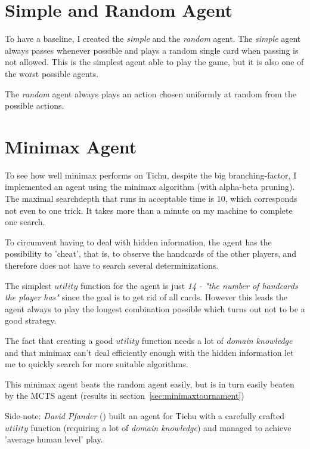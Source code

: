 \section{Simple and Random Agent}
\label{sec:randomagent}
To have a baseline, I created the \textit{simple} and the \textit{random} agent.
The \textit{simple} agent always passes whenever possible and plays a random single card when passing is not allowed. This is the simplest agent able to play the game, but it is also one of the worst possible agents.

The \textit{random} agent always plays an action chosen uniformly at random from the possible actions.


\section{Minimax Agent}
\label{sec:minimaxagent}
To see how well minimax performs on Tichu, despite the big branching-factor, I implemented an agent using the minimax algorithm (with alpha-beta pruning).
The maximal searchdepth that runs in acceptable time is 10, which corresponds not even to one trick. It takes more than a minute on my machine to complete one search.

To circumvent having to deal with hidden information, the agent has the possibility to 'cheat', that is, to observe the handcards of the other players, and therefore does not have to search several determinizations.

The simplest $utility$ function for the agent is just \textit{14 - "the number of handcards the player has"} since the goal is to get rid of all cards. However this leads the agent always to play the longest combination possible which turns out not to be a good strategy.

The fact that creating a good $utility$ function needs a lot of \textit{domain knowledge} and that minimax can't deal efficiently enough with the hidden information let me to quickly search for more suitable algorithms.

This minimax agent beats the random agent easily, but is in turn easily beaten by the MCTS agent (results in section~\ref{sec:minimaxtournament})

Side-note: \textit{David Pfander} (\cite{david12}) built an agent for Tichu with a carefully crafted $utility$ function (requiring a lot of \textit{domain knowledge}) and managed to achieve 'average human level' play.


